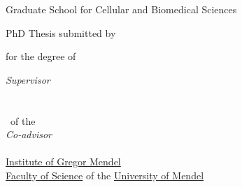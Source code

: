 \documentclass[
11pt, %
english, %
singlespacing, %
headsepline, %
]{MastersDoctoralThesis} %
\author{\fname~ \lname} %
\institute{\href{https://www.izb.unibe.ch/}{Institute of Cell Biology}} %
\begin{document}
\frontmatter %

\pagestyle{plain} %


\begin{titlepage}
{
\vspace*{-3cm}
\hfill
}
 \begin{center}
\hypersetup{hidelinks} 
 \vspace*{.06\textheight}
  {\Large Graduate School for Cellular and Biomedical Sciences\par} %
 {\LARGE \univname\par}\vspace{1.5cm} %

 {\huge \bfseries \ttitle\par}\vspace{0.4cm} %
  {\Large PhD Thesis submitted by}\\[0.5cm]
  {\LARGE \bfseries \authorname \par}\vspace{0.4cm} %
  {\Large for the degree of}\\[0.5cm]
  {\Large \degreename \par}

   \vfill

 \emph{Supervisor}\\[1mm]
 {\Large \supname}\\ %
 {\Large \instname}\\ %
 {\Large  \facname ~of the \univname} \\%

\vspace{0.4cm}
 \emph{Co-advisor}\\[1mm]
 {\Large \coaname}\\ %
 {\Large \href{https://www.mendel.uni.com/}{Institute of Gregor Mendel}}\\
 {\Large \href{https://www.sci.mendel.uni.com/}{Faculty of Science} of the \href{https://www.uni.com/}{University of Mendel}}
 
 \vfill
 \end{center}
\end{titlepage}
\end{document}
